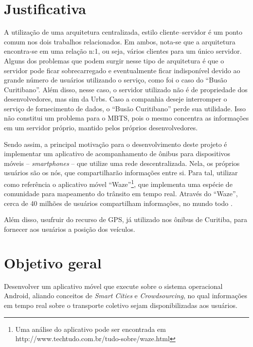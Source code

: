 \section{Justificativa}

A utilização de uma arquitetura centralizada, estilo cliente--servidor é um ponto comum nos dois trabalhos relacionados. Em ambos, nota-se que a arquitetura encontra-se em uma relação n:1, ou seja, vários clientes para um único servidor. Alguns dos problemas que podem surgir nesse tipo de arquitetura é que o servidor pode ficar sobrecarregado e eventualmente ficar indisponível devido ao grande número de usuários utilizando o serviço, como foi o caso do ``Busão Curitibano''. Além disso, nesse caso, o servidor utilizado não é de propriedade dos desenvolvedores, mas sim da Urbs. Caso a companhia deseje interromper o serviço de fornecimento de dados, o ``Busão Curitibano'' perde sua utilidade. Isso não constitui um problema para o MBTS, pois o mesmo concentra as informações em um servidor próprio, mantido pelos próprios desenvolvedores.

Sendo assim, a principal motivação para o desenvolvimento deste projeto é implementar um aplicativo de acompanhamento de ônibus para dispositivos móveis -- \textit{smartphones} -- que utilize uma rede descentralizada. Nela, os próprios usuários são os nós, que compartilharão informações entre si. Para tal, utilizar como referência o aplicativo móvel ``Waze''\footnote{Uma análise do aplicativo pode ser encontrada em http://www.techtudo.com.br/tudo-sobre/waze.html}, que implementa uma espécie de comunidade para mapeamento do trânsito em tempo real. Através do ``Waze'', cerca de 40 milhões de usuários compartilham informações, no mundo todo \cite{techtudoWaze}.

Além disso, usufruir do recurso de GPS, já utilizado nos ônibus de Curitiba, para fornecer aos usuários a posição dos veículos.

\section{Objetivo geral}

Desenvolver um aplicativo móvel que execute sobre o sistema operacional Android, aliando conceitos de \textit{Smart Cities}
e \textit{Crowdsourcing}, no qual informações em tempo real sobre o transporte coletivo sejam disponibilizadas aos usuários.



